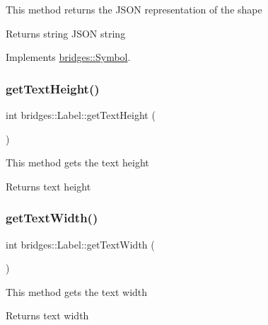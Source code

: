 This method returns the J\+S\+ON representation of the shape

\begin{DoxyReturn}{Returns}
string J\+S\+ON string 
\end{DoxyReturn}


Implements \mbox{\hyperlink{classbridges_1_1_symbol_ab4dd31fbc736b2e58e8b8bb8446eac73}{bridges\+::\+Symbol}}.

\mbox{\label{classbridges_1_1_label_a65746c9728f3b4e0c4b5c4d9ab0d4ee1}} 
\subsubsection{\texorpdfstring{getTextHeight()}{getTextHeight()}}
{\footnotesize\ttfamily int bridges\+::\+Label\+::get\+Text\+Height (\begin{DoxyParamCaption}{ }\end{DoxyParamCaption})\hspace{0.3cm}{\ttfamily [inline]}}

This method gets the text height

\begin{DoxyReturn}{Returns}
text height 
\end{DoxyReturn}
\mbox{\label{classbridges_1_1_label_ae5259108e1d7c9aa63475a356e9759b7}} 
\subsubsection{\texorpdfstring{getTextWidth()}{getTextWidth()}}
{\footnotesize\ttfamily int bridges\+::\+Label\+::get\+Text\+Width (\begin{DoxyParamCaption}{ }\end{DoxyParamCaption})\hspace{0.3cm}{\ttfamily [inline]}}

This method gets the text width

\begin{DoxyReturn}{Returns}
text width 
\end{DoxyReturn}
\mbox{\label{classbridges_1_1_label_aee9777172a46b4b2e099a4d1e317b6c1}} 
